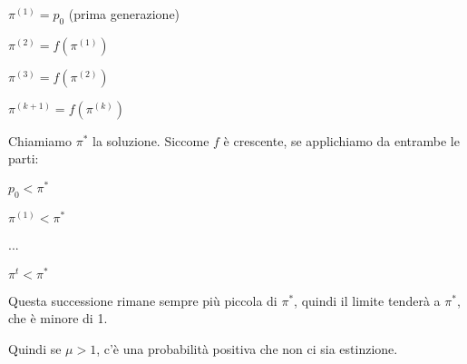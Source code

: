 \documentclass[a4paper,12pt]{book}
\begin{document}
$ \pi^{(1)} = p_0 $ (prima generazione)

$ \pi^{(2)} = f(\pi^{(1)}) $

$ \pi^{(3)} = f(\pi^{(2)}) $

$ \pi^{(k+1)} = f(\pi^{(k)}) $

Chiamiamo $\pi^*$ la soluzione. Siccome $ f $ è crescente, se applichiamo da entrambe le parti:

$ p_0 < \pi^* $

$ \pi^{(1)} < \pi^* $

...

$ \pi^t < \pi^* $

Questa successione rimane sempre più piccola di $\pi^*$, quindi il limite tenderà a $ \pi^* $, che è minore di 1.

Quindi se $ \mu > 1$, c'è una probabilità positiva che non ci sia estinzione. 

\end{document}
